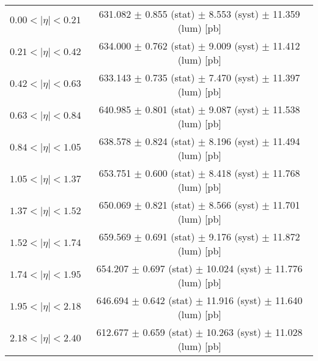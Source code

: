 \begin{tabular}{lc}
\hline
$0.00 < |\eta| <0.21$          & 631.082 $\pm$ 0.855 (stat) $\pm$ 8.553 (syst) $\pm$ 11.359 (lum) [pb]  \\
$0.21 < |\eta| <0.42$          & 634.000 $\pm$ 0.762 (stat) $\pm$ 9.009 (syst) $\pm$ 11.412 (lum) [pb]  \\
$0.42 < |\eta| <0.63$          & 633.143 $\pm$ 0.735 (stat) $\pm$ 7.470 (syst) $\pm$ 11.397 (lum) [pb]  \\
$0.63 < |\eta| <0.84$          & 640.985 $\pm$ 0.801 (stat) $\pm$ 9.087 (syst) $\pm$ 11.538 (lum) [pb]  \\
$0.84 < |\eta| <1.05$          & 638.578 $\pm$ 0.824 (stat) $\pm$ 8.196 (syst) $\pm$ 11.494 (lum) [pb]  \\
$1.05 < |\eta| <1.37$          & 653.751 $\pm$ 0.600 (stat) $\pm$ 8.418 (syst) $\pm$ 11.768 (lum) [pb]  \\
$1.37 < |\eta| <1.52$          & 650.069 $\pm$ 0.821 (stat) $\pm$ 8.566 (syst) $\pm$ 11.701 (lum) [pb]  \\
$1.52 < |\eta| <1.74$          & 659.569 $\pm$ 0.691 (stat) $\pm$ 9.176 (syst) $\pm$ 11.872 (lum) [pb]  \\
$1.74 < |\eta| <1.95$          & 654.207 $\pm$ 0.697 (stat) $\pm$ 10.024 (syst) $\pm$ 11.776 (lum) [pb]  \\
$1.95 < |\eta| <2.18$          & 646.694 $\pm$ 0.642 (stat) $\pm$ 11.916 (syst) $\pm$ 11.640 (lum) [pb]  \\
$2.18 < |\eta| <2.40$          & 612.677 $\pm$ 0.659 (stat) $\pm$ 10.263 (syst) $\pm$ 11.028 (lum) [pb]  \\
\hline
\end{tabular}
